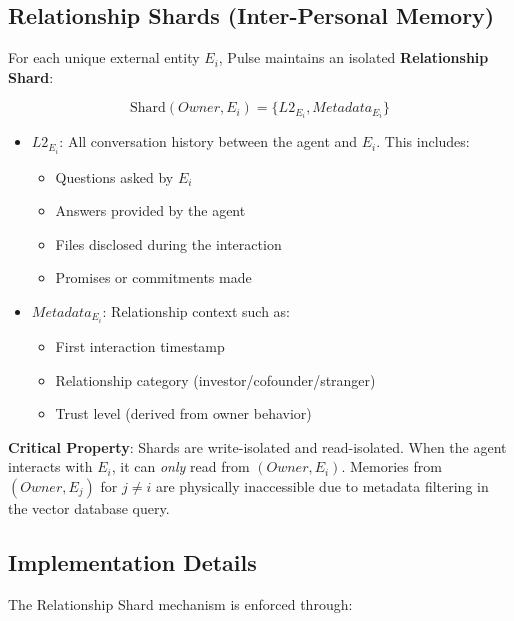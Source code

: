 \subsection{Relationship Shards (Inter-Personal Memory)}

For each unique external entity $E_i$, Pulse maintains an isolated \textbf{Relationship Shard}:

\[
\text{Shard}(Owner, E_i) = \{ L2_{E_i}, Metadata_{E_i} \}
\]

\begin{itemize}
    \item \textbf{$L2_{E_i}$}: All conversation history between the agent and $E_i$. This includes:
    \begin{itemize}
        \item Questions asked by $E_i$
        \item Answers provided by the agent
        \item Files disclosed during the interaction
        \item Promises or commitments made
    \end{itemize}

    \item \textbf{$Metadata_{E_i}$}: Relationship context such as:
    \begin{itemize}
        \item First interaction timestamp
        \item Relationship category (investor/cofounder/stranger)
        \item Trust level (derived from owner behavior)
    \end{itemize}
\end{itemize}

\textbf{Critical Property}: Shards are write-isolated and read-isolated. When the agent interacts with $E_i$, it can \textit{only} read from $(Owner, E_i)$. Memories from $(Owner, E_j)$ for $j \neq i$ are physically inaccessible due to metadata filtering in the vector database query.

\subsection{Implementation Details}

The Relationship Shard mechanism is enforced through:


